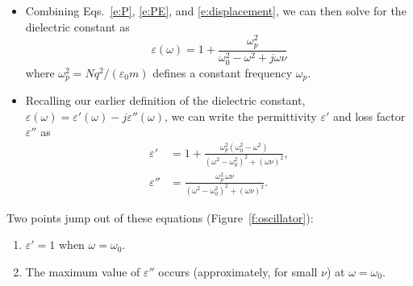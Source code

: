 \documentclass[11pt, oneside]{article}
\begin{document}
\begin{itemize}
\begin{itemize}
	\end{itemize}
	\item Combining Eqs.~\eqref{e:P}, \eqref{e:PE}, and \eqref{e:displacement}, we can then solve for the dielectric constant as
	\begin{equation}
		\label{e:oscillator}
		\boxed{\varepsilon(\omega) = 1 + \frac{\omega_p^2}{\omega_0^2 - \omega^2 + j\omega\nu}}
	\end{equation}
	where $\omega_p^2 = Nq^2/(\varepsilon_0 m)$ defines a constant frequency $\omega_p$.
	\item Recalling our earlier definition of the dielectric constant, $\varepsilon(\omega) = \varepsilon'(\omega) - j\varepsilon''(\omega)$, we can write the permittivity $\varepsilon'$ and loss factor $\varepsilon''$ as
	\begin{align}
		\varepsilon' &= 1 + \frac{\omega_p^2(\omega_0^2 - \omega^2)}{(\omega^2 - \omega_0^2)^2 + (\omega\nu)^2}, \\
		\varepsilon'' &= \frac{\omega_p^2\,\omega\nu}{(\omega^2 - \omega_0^2)^2 + (\omega\nu)^2}.
	\end{align}
\end{itemize}

Two points jump out of these equations (Figure~\ref{f:oscillator}):
\begin{enumerate}
	\item $\varepsilon' = 1$ when $\omega = \omega_0$.
	\item The maximum value of $\varepsilon''$ occurs (approximately, for small $\nu$) at $\omega = \omega_0$.
\end{enumerate}
\end{document}
